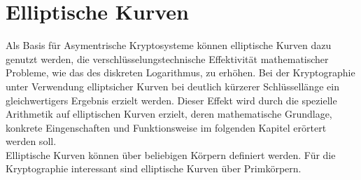 

\chapter{Elliptische Kurven}


Als Basis für Asymentrische Kryptosysteme können elliptische Kurven dazu genutzt werden, die verschlüsselungstechnische Effektivität mathematischer Probleme, wie das des diskreten Logarithmus, zu erhöhen. Bei der Kryptographie unter Verwendung elliptsicher Kurven bei deutlich kürzerer Schlüssellänge ein gleichwertigers Ergebnis erzielt werden. Dieser Effekt wird durch die spezielle Arithmetik auf elliptischen Kurven erzielt, deren mathematische Grundlage, konkrete Eingenschaften und Funktionsweise im folgenden Kapitel erörtert werden soll.\\

Elliptische Kurven können über beliebigen Körpern definiert werden. Für die Kryptographie interessant sind elliptische Kurven über Primkörpern.





